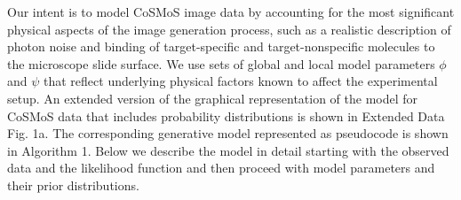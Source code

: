 Our intent is to model CoSMoS image data by accounting for the most significant physical aspects of the image generation process, such as a realistic description of photon noise and binding of target-specific and target-nonspecific molecules to the microscope slide surface. We use sets of global and local model parameters $\phi$ and $\psi$ that reflect underlying physical factors known to affect the experimental setup. An extended version of the graphical representation of the model for CoSMoS data that includes probability distributions is shown in Extended Data Fig. 1a. The corresponding generative model represented as pseudocode is shown in Algorithm 1. Below we describe the model in detail starting with the observed data and the likelihood function and then proceed with model parameters and their prior distributions.



